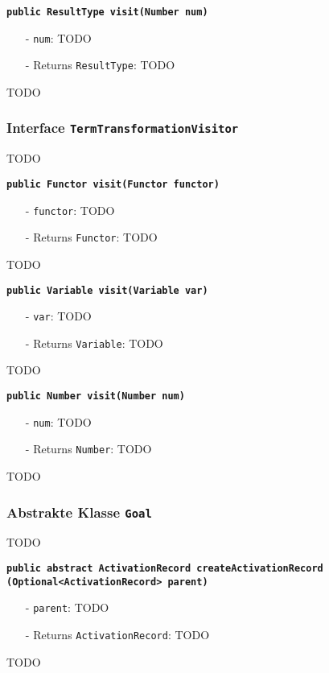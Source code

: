 \documentclass[parskip=full,11pt,twoside]{scrartcl}
\begin{document}
\textbf{\texttt{public ResultType visit(Number num)}}
\begin{itemize}[noitemsep]
	\item[-] \texttt{num}: TODO
	\item[-] Returns \texttt{ResultType}: TODO
\end{itemize}
TODO

\subsubsection{Interface \texttt{TermTransformationVisitor}}
TODO

\textbf{\texttt{public Functor visit(Functor functor)}}
\begin{itemize}[noitemsep]
	\item[-] \texttt{functor}: TODO
	\item[-] Returns \texttt{Functor}: TODO
\end{itemize}
TODO

\textbf{\texttt{public Variable visit(Variable var)}}
\begin{itemize}[noitemsep]
	\item[-] \texttt{var}: TODO
	\item[-] Returns \texttt{Variable}: TODO
\end{itemize}
TODO

\textbf{\texttt{public Number visit(Number num)}}
\begin{itemize}[noitemsep]
	\item[-] \texttt{num}: TODO
	\item[-] Returns \texttt{Number}: TODO
\end{itemize}
TODO
\subsubsection{Abstrakte Klasse \texttt{Goal}}
TODO

\textbf{\texttt{public abstract ActivationRecord createActivationRecord\\(Optional<ActivationRecord> parent)}}
\begin{itemize}[noitemsep]
	\item[-] \texttt{parent}: TODO
	\item[-] Returns \texttt{ActivationRecord}: TODO
\end{itemize}
TODO
\end{document}
